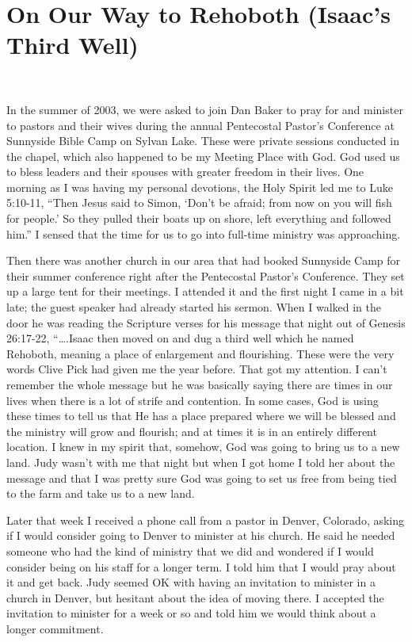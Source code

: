 \documentclass[oneside]{book}
\begin{document}
\section{On Our Way to Rehoboth (Isaac's Third Well)}
\

In the summer of 2003, we were asked to join Dan Baker to pray for and minister to pastors and their wives during the annual Pentecostal Pastor’s Conference at Sunnyside Bible Camp on Sylvan Lake. These were private sessions conducted in the chapel, which also happened to be my Meeting Place with God. God used us to bless leaders and their spouses with greater freedom in their lives. One morning as I was having my personal devotions, the Holy Spirit led me to Luke 5:10-11, “Then Jesus said to Simon, ‘Don’t be afraid; from now on you will fish for people.’ So they pulled their boats up on shore, left everything and followed him.” I sensed that the time for us to go into full-time ministry was approaching. 

Then there was another church in our area that had booked Sunnyside Camp for their summer conference right after the Pentecostal Pastor’s Conference. They set up a large tent for their meetings. I attended it and the first night I came in a bit late; the guest speaker had already started his sermon. When I walked in the door he was reading the Scripture verses for his message that night out of Genesis 26:17-22, “….Isaac then moved on and dug a third well which he named Rehoboth, meaning a place of enlargement and flourishing. These were the very words Clive Pick had given me the year before. That got my attention. I can’t remember the whole message but he was basically saying there are times in our lives when there is a lot of strife and contention. In some cases, God is using these times to tell us that He has a place prepared where we will be blessed and the ministry will grow and flourish; and at times it is in an entirely different location. I knew in my spirit that, somehow, God was going to bring us to a new land. Judy wasn’t with me that night but when I got home I told her about the message and that I was pretty sure God was going to set us free from being tied to the farm and take us to a new land. 

Later that week I received a phone call from a pastor in Denver, Colorado, asking if I would consider going to Denver to minister at his church. He said he needed someone who had the kind of ministry that we did and wondered if I would consider being on his staff for a longer term. I told him that I would  pray about it and get back. Judy seemed OK with having an invitation to minister in a church in Denver, but hesitant about the idea of moving there. I accepted the invitation to minister for a week or so and told him we would think about a longer commitment.
\end{document}
